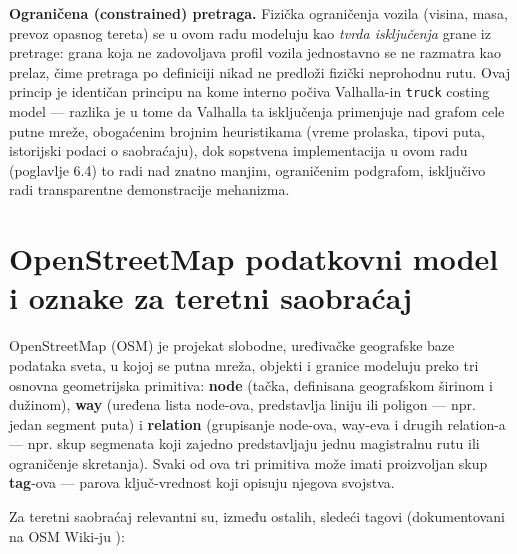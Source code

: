 \textbf{Ograničena (constrained) pretraga.} Fizička ograničenja vozila (visina, masa, prevoz opasnog tereta) se u ovom radu modeluju kao \emph{tvrda isključenja} grane iz pretrage: grana koja ne zadovoljava profil vozila jednostavno se ne razmatra kao prelaz, čime pretraga po definiciji nikad ne predloži fizički neprohodnu rutu. Ovaj princip je identičan principu na kome interno počiva Valhalla-in \texttt{truck} costing model — razlika je u tome da Valhalla ta isključenja primenjuje nad grafom cele putne mreže, obogaćenim brojnim heuristikama (vreme prolaska, tipovi puta, istorijski podaci o saobraćaju), dok sopstvena implementacija u ovom radu (poglavlje 6.4) to radi nad znatno manjim, ograničenim podgrafom, isključivo radi transparentne demonstracije mehanizma.

\section{OpenStreetMap podatkovni model i oznake za teretni saobraćaj}

OpenStreetMap (OSM) je projekat slobodne, uređivačke geografske baze podataka sveta, u kojoj se putna mreža, objekti i granice modeluju preko tri osnovna geometrijska primitiva: \textbf{node} (tačka, definisana geografskom širinom i dužinom), \textbf{way} (uređena lista node-ova, predstavlja liniju ili poligon — npr. jedan segment puta) i \textbf{relation} (grupisanje node-ova, way-eva i drugih relation-a — npr. skup segmenata koji zajedno predstavljaju jednu magistralnu rutu ili ograničenje skretanja). Svaki od ova tri primitiva može imati proizvoljan skup \textbf{tag}-ova — parova ključ-vrednost koji opisuju njegova svojstva.

Za teretni saobraćaj relevantni su, između ostalih, sledeći tagovi (dokumentovani na OSM Wiki-ju \cite{osmwiki}):

